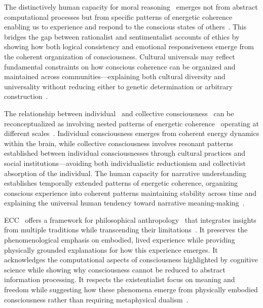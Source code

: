 The distinctively human capacity for moral reasoning~ emerges not from abstract computational processes but from specific patterns of energetic coherence~ enabling us to experience and respond to the conscious states of others~\cite{Taylor1991}. This bridges the gap between rationalist and sentimentalist accounts of ethics by showing how both logical consistency and emotional responsiveness emerge from the coherent organization of consciousness. Cultural universals may reflect fundamental constraints on how conscious coherence can be organized and maintained across communities—explaining both cultural diversity and universality without reducing either to genetic determination or arbitrary construction~\cite{Brown1991}.

The relationship between individual~ and collective consciousness~ can be reconceptualized as involving nested patterns of energetic coherence~ operating at different scales~\cite{Ricoeur1984}. Individual consciousness emerges from coherent energy dynamics within the brain, while collective consciousness involves resonant patterns established between individual consciousnesses through cultural practices and social institutions—avoiding both individualistic reductionism and collectivist absorption of the individual. The human capacity for narrative understanding~ establishes temporally extended patterns of energetic coherence, organizing conscious experience into coherent patterns maintaining stability across time and explaining the universal human tendency toward narrative meaning-making~\cite{Bruner1990}.

ECC~ offers a framework for philosophical anthropology~ that integrates insights from multiple traditions while transcending their limitations~\cite{Heidegger1962, Sartre1956}. It preserves the phenomenological emphasis on embodied, lived experience while providing physically grounded explanations for how this experience emerges. It acknowledges the computational aspects of consciousness highlighted by cognitive science while showing why consciousness cannot be reduced to abstract information processing. It respects the existentialist focus on meaning and freedom while suggesting how these phenomena emerge from physically embodied consciousness rather than requiring metaphysical dualism~\cite{Camus1955}.

